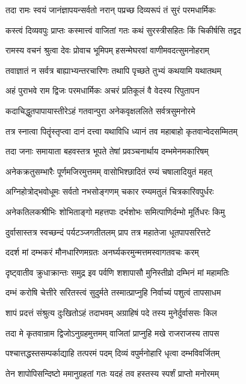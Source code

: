 \twolineshloka
{तदा रामः स्वयं जानंज्ञापयन्सर्वतो नरान्}
{पप्रच्छ दिव्यरूपं तं सुरं परमधार्मिकः}%

\twolineshloka
{कस्त्वं दिव्यवपुः प्राप्तः कस्मात्त्वं वाजितां गतः}
{कथं सुरस्त्रीसहितः किं चिकीर्षसि तद्वद}%

\twolineshloka
{रामस्य वचनं श्रुत्वा देवः प्रोवाच भूमिपम्}
{हसन्मेघरवां वाणीमवदत्सुमनोहराम्}%

\twolineshloka
{तवाज्ञातं न सर्वत्र बाह्याभ्यन्तरचारिणः}
{तथापि पृच्छते तुभ्यं कथयामि यथातथम्}%

\twolineshloka
{अहं पुराभवे राम द्विजः परमधार्मिकः}
{अचरं प्रतिकूलं वै वेदस्य रिपुतापन}%

\twolineshloka
{कदाचिद्धुतपापायास्तीरेऽहं गतवान्पुरा}
{अनेकवृक्षललिते सर्वत्रसुमनोरमे}%

\twolineshloka
{तत्र स्नात्वा पितॄंस्तृप्त्वा दानं दत्त्वा यथाविधि}
{ध्यानं तव महाबाहो कृतवान्वेदसम्मितम्}%

\twolineshloka
{तदा जनाः समायाता बहवस्तत्र भूपते}
{तेषां प्रवञ्चनार्थाय दम्भमेनमकारिषम्}%

\twolineshloka
{अनेकक्रतुसम्भारैः पूर्णमजिरमुत्तमम्}
{वासोभिश्छादितं रम्यं चषालादियुतं महत्}%

\twolineshloka
{अग्निहोत्रोद्भवोधूमः सर्वतो नभसोङ्गणम्}
{चकार रम्यमतुलं चित्रकारिवपुर्धरः}%

\twolineshloka
{अनेकतिलकश्रीभिः शोभिताङ्गो महत्तपाः}
{दर्भशोभः समित्पाणिर्दम्भो मूर्तिधरः किमु}%

\twolineshloka
{दुर्वासास्तत्र स्वच्छन्दं पर्यटञ्जगतीतलम्}
{प्राप तत्र महातेजा धूतपापसरित्तटे}%

\twolineshloka
{ददर्श मां दम्भकरं मौनधारिणमग्रतः}
{अनर्घ्यकरमुन्मत्तमस्वागतवचः करम्}%

\twolineshloka
{दृष्ट्वातीव क्रुधाक्रान्तः समुद्र इव पर्वणि}
{शशापासौ मुनिस्तीव्रो दम्भिनं मां महामतिः}%

\twolineshloka
{दम्भं करोषि चेत्तीरे सरितस्त्वं सुदुर्मते}
{तस्मात्प्राप्नुहि निर्वाच्यं पशुत्वं तापसाधम}%

\twolineshloka
{शापं प्रदत्तं संश्रुत्य दुःखितोऽहं तदाभवम्}
{अग्राहिषं पदे तस्य मुनेर्दुर्वाससः किल}%

\twolineshloka
{तदा मे कृतवान्राम द्विजोऽनुग्रहमुत्तमम्}
{वाजितां प्राप्नुहि मखे राजराजस्य तापस}%

\twolineshloka
{पश्चात्तद्धस्तसम्पर्काद्याहि तत्परमं पदम्}
{दिव्यं वपुर्मनोहारि धृत्वा दम्भविवर्जितम्}%

\twolineshloka
{तेन शापोपिसन्दिष्टो ममानुग्रहतां गतः}
{यदहं तव हस्तस्य स्पर्शं प्राप्तो मनोरमम्}%

